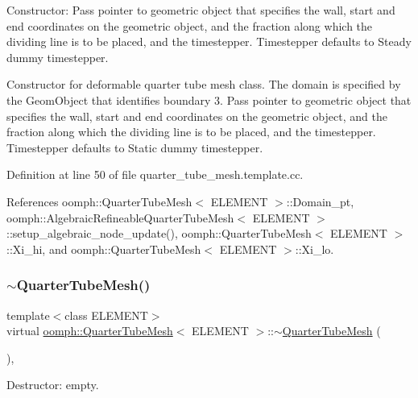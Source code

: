 Constructor\+: Pass pointer to geometric object that specifies the wall, start and end coordinates on the geometric object, and the fraction along which the dividing line is to be placed, and the timestepper. Timestepper defaults to Steady dummy timestepper. 

Constructor for deformable quarter tube mesh class. The domain is specified by the Geom\+Object that identifies boundary 3. Pass pointer to geometric object that specifies the wall, start and end coordinates on the geometric object, and the fraction along which the dividing line is to be placed, and the timestepper. Timestepper defaults to Static dummy timestepper. 

Definition at line 50 of file quarter\+\_\+tube\+\_\+mesh.\+template.\+cc.



References oomph\+::\+Quarter\+Tube\+Mesh$<$ E\+L\+E\+M\+E\+N\+T $>$\+::\+Domain\+\_\+pt, oomph\+::\+Algebraic\+Refineable\+Quarter\+Tube\+Mesh$<$ E\+L\+E\+M\+E\+N\+T $>$\+::setup\+\_\+algebraic\+\_\+node\+\_\+update(), oomph\+::\+Quarter\+Tube\+Mesh$<$ E\+L\+E\+M\+E\+N\+T $>$\+::\+Xi\+\_\+hi, and oomph\+::\+Quarter\+Tube\+Mesh$<$ E\+L\+E\+M\+E\+N\+T $>$\+::\+Xi\+\_\+lo.

\mbox{\label{classoomph_1_1QuarterTubeMesh_aeb6ec7337a9e1666ebc6c942e788bab7}} 
\subsubsection{\texorpdfstring{$\sim$\+Quarter\+Tube\+Mesh()}{~QuarterTubeMesh()}}
{\footnotesize\ttfamily template$<$class E\+L\+E\+M\+E\+NT$>$ \\
virtual \hyperlink{classoomph_1_1QuarterTubeMesh}{oomph\+::\+Quarter\+Tube\+Mesh}$<$ E\+L\+E\+M\+E\+NT $>$\+::$\sim$\hyperlink{classoomph_1_1QuarterTubeMesh}{Quarter\+Tube\+Mesh} (\begin{DoxyParamCaption}{ }\end{DoxyParamCaption})\hspace{0.3cm}{\ttfamily [inline]}, {\ttfamily [virtual]}}



Destructor\+: empty. 




